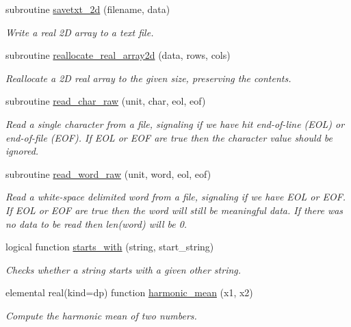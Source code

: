 \begin{DoxyCompactItemize}
subroutine \mbox{\hyperlink{namespacepmc__util_a136a49845a94549788f385e2c0f625a6}{savetxt\+\_\+2d}} (filename, data)
\begin{DoxyCompactList}\small\item\em Write a real 2D array to a text file. \end{DoxyCompactList}\item 
subroutine \mbox{\hyperlink{namespacepmc__util_ae3535489875ec1ba14b921bd43cff11c}{reallocate\+\_\+real\+\_\+array2d}} (data, rows, cols)
\begin{DoxyCompactList}\small\item\em Reallocate a 2D real array to the given size, preserving the contents. \end{DoxyCompactList}\item 
subroutine \mbox{\hyperlink{namespacepmc__util_ad88e1503acea1e8e33d13275f37b9755}{read\+\_\+char\+\_\+raw}} (unit, char, eol, eof)
\begin{DoxyCompactList}\small\item\em Read a single character from a file, signaling if we have hit end-\/of-\/line (E\+OL) or end-\/of-\/file (E\+OF). If E\+OL or E\+OF are true then the character value should be ignored. \end{DoxyCompactList}\item 
subroutine \mbox{\hyperlink{namespacepmc__util_aa8ba2bc88e899084afec8b5d7f3a8b92}{read\+\_\+word\+\_\+raw}} (unit, word, eol, eof)
\begin{DoxyCompactList}\small\item\em Read a white-\/space delimited word from a file, signaling if we have E\+OL or E\+OF. If E\+OL or E\+OF are true then the word will still be meaningful data. If there was no data to be read then len(word) will be 0. \end{DoxyCompactList}\item 
logical function \mbox{\hyperlink{namespacepmc__util_a397fa3e495a78638d8abfdb798d632f0}{starts\+\_\+with}} (string, start\+\_\+string)
\begin{DoxyCompactList}\small\item\em Checks whether a string starts with a given other string. \end{DoxyCompactList}\item 
elemental real(kind=dp) function \mbox{\hyperlink{namespacepmc__util_ae5311f9f48ddfa5b7c24658526276621}{harmonic\+\_\+mean}} (x1, x2)
\begin{DoxyCompactList}\small\item\em Compute the harmonic mean of two numbers. \end{DoxyCompactList}\item 

\end{DoxyCompactItemize}
